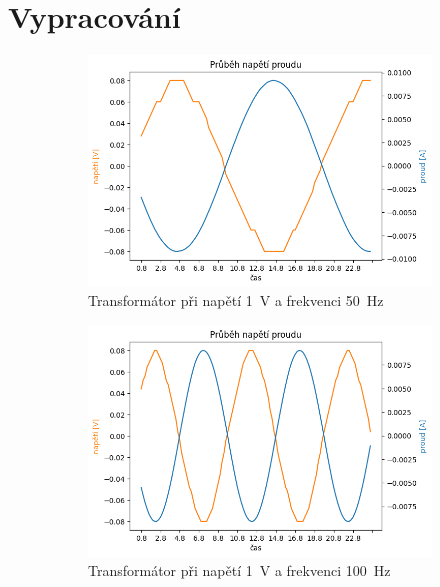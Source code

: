 \documentclass[a4paper]{article}
\begin{document}
\section*{Vypracování}
\begin{figure}[h!]
	\centering
	\begin{subfigure}{0.49\textwidth}
		\includegraphics[width=\textwidth]{Trafo1b_1V.png}
		\caption{Transformátor při napětí \SI{1}{\volt} a frekvenci \SI{50}{\hertz}}
	\end{subfigure}
	\hfill
	\begin{subfigure}{0.49\textwidth}
		\includegraphics[width=\textwidth]{Trafo1b_1V_100Hz.png}
		\caption{Transformátor při napětí \SI{1}{\volt} a frekvenci \SI{100}{\hertz}}
	\end{subfigure}
	\hfill
	\begin{subfigure}{0.49\textwidth}

\end{subfigure}
\end{figure}
\end{document}
